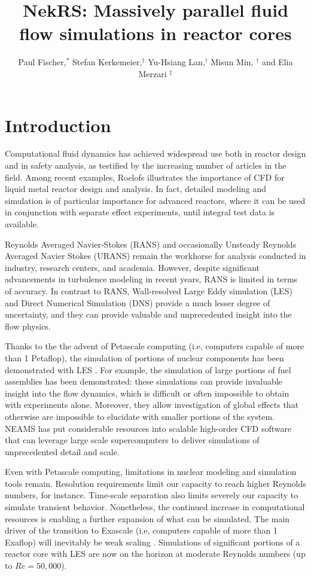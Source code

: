 \documentclass{anstrans}
\title{NekRS: Massively parallel fluid flow simulations in reactor cores}
\author{Paul Fischer,$^{*}$ Stefan Kerkemeier,$^{\dagger}$ Yu-Hsiang Lan,$^{\dagger}$ Misun Min, $^{\dagger}$ and Elia Merzari $^{\ddagger}$}
\institute{
$^{*}$ University of Illinois at Urbana-Champaign, fischerp@illinois.edu
\and
$^{\dagger}$ Argonne National Laboratory
\and
$^{\ddagger}$ Pennsylvania State University
}
\begin{document}
\section{Introduction}

Computational fluid dynamics has achieved  widespread use both in reactor design and in safety analysis, as testified by the increasing number of articles in the field. Among recent examples, Roelofs \cite{roelofs2018thermal} illustrates the importance of CFD for liquid metal reactor design and analysis. In fact, detailed modeling and simulation is of particular importance for advanced reactors,  where it can be used in conjunction with separate effect experiments, until integral test data is available.

Reynolds Averaged Navier-Stokes (RANS) and occasionally Unsteady Reynolds Averaged Navier Stokes (URANS) remain the workhorse for analysis conducted in industry, research centers, and academia.  However, despite significant advancements in turbulence modeling in recent years, RANS is limited in terms of accuracy.   In contrast to RANS, Wall-resolved Large Eddy simulation (LES) and Direct Numerical Simulation (DNS) provide a much lesser degree of uncertainty, and they can provide valuable and unprecedented insight into the flow physics.

Thanks to the the advent of Petascale computing (i.e, computers capable of more than 1 Petaflop), the simulation of portions of nuclear components has been demonstrated with LES \cite{merzari2020}. For example, the simulation of large portions of fuel assemblies has been demonstrated:  these simulations can provide invaluable insight into the flow dynamics, which is difficult or often impossible to obtain with experiments alone. Moreover, they allow investigation of global effects that otherwise are impossible to elucidate with smaller portions of the system. NEAMS has put considerable resources into scalable high-order CFD software that can leverage large scale supercomputers to deliver simulations of unprecedented detail and scale.

Even with Petascale computing, limitations in nuclear modeling and simulation tools remain. Resolution requirements limit our capacity to reach higher Reynolds numbers, for instance. Time-scale separation also limits severely our capacity to simulate transient behavior. Nonetheless, the continued increase in computational resources is enabling a further expansion of what can be simulated. The main driver of the transition to Exascale (i.e, computers capable of more than 1 Exaflop) will inevitably be weak scaling \cite{merzari2017large}. Simulations of significant portions of a reactor core with LES are now on the horizon at moderate Reynolds numbers (up to $Re=50,000$).
\end{document}
